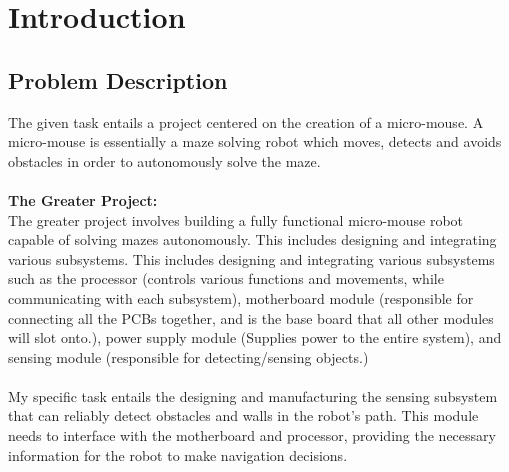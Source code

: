 \documentclass[class=report,11pt,crop=false]{standalone}
\begin{document}
\chapter{Introduction} \label{ch:introduction}
\vspace{-1cm}

\section{Problem Description}
The given task entails a project centered on the creation of a micro-mouse. A micro-mouse is essentially a maze solving robot which moves, detects and avoids obstacles in order to autonomously solve the maze.  \\ \\
\textbf{The Greater Project:} \\
The greater project involves building a fully functional micro-mouse robot capable of solving mazes autonomously. This includes designing and integrating various subsystems. This includes designing and integrating various subsystems such as the processor (controls various functions and movements, while communicating with each subsystem), motherboard module (responsible for connecting all the PCBs together, and is the base board that all other modules will slot onto.), power supply module (Supplies power to the entire system), and sensing module (responsible for detecting/sensing objects.) \\ \\
My specific task entails the designing and manufacturing the sensing subsystem that can reliably detect obstacles and walls in the robot's path. This module needs to interface with the motherboard and processor, providing the necessary information for the robot to make navigation decisions. 
\end{document}
